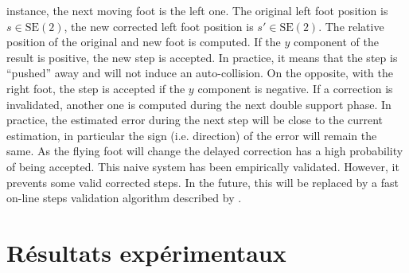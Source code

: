 instance, the next moving foot is the left one. The original left foot
position is \mbox{$s \in \text{SE}(2)$}, the new corrected left foot
position is \mbox{$s' \in \text{SE}(2)$}. The relative position of the
original and new foot is computed. If the $y$ component of the result
is positive, the new step is accepted. In practice, it means that the
step is ``pushed'' away and will not induce an auto-collision. On the
opposite, with the right foot, the step is accepted if the $y$
component is negative.
%
%
If a correction is invalidated, another one is computed during the
next double support phase. In practice, the estimated error during the
next step will be close to the current estimation, in particular the
sign (i.e. direction) of the error will remain the same. As the flying
foot will change the delayed correction has a high probability of
being accepted.
%
%
This naive system has been empirically validated. However, it prevents
some valid corrected steps. In the future, this will be replaced by a
fast on-line steps validation algorithm described by
\cite{10icra.perrin}.

\section{Résultats expérimentaux}\label{exp}


